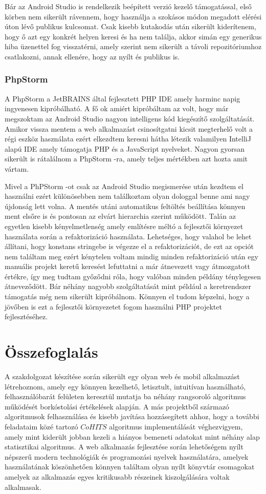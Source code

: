 \documentclass[12pt]{report}
\theoremstyle{definition}
\begin{document}
	Bár az Android Studio is rendelkezik beépített verzió kezelő támogatással, első körben nem sikerült rávennem, hogy használja a szokásos módon megadott elérési úton lévő publikus kulcsomat. Csak kisebb kutakodás után sikerült kiderítenem, hogy ő azt egy konkrét helyen keresi és ha nem találja, akkor simán egy generikus hiba üzenettel fog visszatérni, amely szerint nem sikerült a távoli repozitóriumhoz csatlakozni, annak ellenére, hogy az nyílt és publikus is.
	
	\subsection{PhpStorm}
	A PhpStorm a JetBRAINS által fejlesztett PHP IDE amely harminc napig ingyenesen kipróbálható. A fő ok amiért kipróbáltam az volt, hogy már megszoktam az Android Studio nagyon intelligens kód kiegészítő szolgáltatását. Amikor vissza mentem a web alkalmazást csinosítgatni kicsit megterhelő volt a régi eszköz használata ezért elkezdtem keresni hátha létezik valamilyen IntelliJ alapú IDE amely támogatja PHP és a JavaScript nyelveket. Nagyon gyorsan sikerült is rátalálnom a PhpStorm -ra, amely teljes mértékben azt hozta amit vártam.
	
	Mivel a PhPStorm -ot csak az Android Studio megismerése után kezdtem el használni ezért különösebben nem találkoztam olyan dologgal benne ami nagy újdonság lett volna. A mentés utáni automatikus feltöltés beállítása könnyen ment elsőre is és pontosan az elvárt hierarchia szerint működött. Talán az egyetlen kisebb kényelmetlenség amely említésre méltó a fejlesztői környezet használata során a refaktorizáció használata. Lehetséges, hogy valahol be lehet állítani, hogy konstans stringebe is végezze el a refaktorizációt, de ezt az opciót nem találtam meg ezért kénytelen voltam mindig minden refaktorizáció után egy manuális projekt keretű keresést lefuttatni a már átnevezett vagy átmozgatott értékre, így meg tudtam győződni róla, hogy valóban minden példány ténylegesen átneveződött. Bár néhány nagyobb szolgáltatását mint például a keretrendszer támogatás még nem sikerült kipróbálnom. Könnyen el tudom képzelni, hogy a jövőben is ezt a fejlesztői környezetet fogom használni PHP projektet fejlesztéséhez.
	
	\chapter{Összefoglalás}
	A szakdolgozat készítése során sikerült egy olyan web és mobil alkalmazást létrehoznom, amely egy könnyen kezelhető, letisztult, intuitívan használható, felhasználóbarát felületen keresztül mutatja ba néhány rangsoroló algoritmus működését borkóstolási értékelések alapján. A más projektből származó algoritmusok felhasználása és kisebb javítása hozzásegített ahhoz, hogy a további feladataim közé tartozó $CoHITS$ algoritmus implementálását véghezvigyem, amely mint kiderült jobban kezeli a hiányos bemeneti adatokat mint néhány alap statisztikai algoritmus. A web alkalmazás fejlesztése során lehetőségem nyílt népszerű modern technológiák és programozási nyelvek használatára, amelyek használatának köszönhetően könnyen találtam olyan nyílt könyvtár csomagokat amelyek az alkalmazás egyes kritikusabb részeinek kiszolgálására voltak alkalmasak.
	
\end{document}
